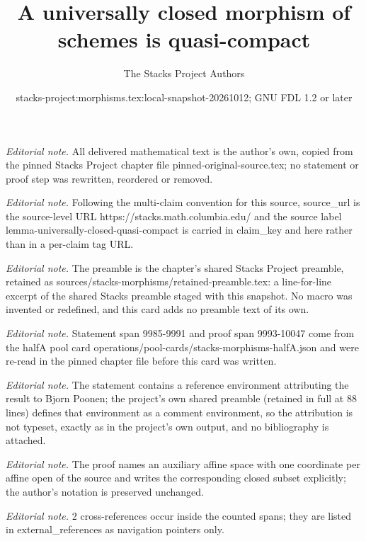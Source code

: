 \documentclass[10pt,a4paper]{amsart}
\title{A universally closed morphism of schemes is quasi-compact}
\author{The Stacks Project Authors}
\date{stacks-project:morphisms.tex:local-snapshot-20261012; GNU FDL 1.2 or later}
\theoremstyle{plain}
\theoremstyle{definition}
\theoremstyle{remark}
\numberwithin{equation}{subsection}
\begin{document}
\maketitle
\noindent\textit{Editorial note.} All delivered mathematical text is the author's own, copied from the pinned Stacks Project chapter file pinned-original-source.tex; no statement or proof step was rewritten, reordered or removed.\par\medskip
\noindent\textit{Editorial note.} Following the multi-claim convention for this source, source\_url is the source-level URL https://stacks.math.columbia.edu/ and the source label lemma-universally-closed-quasi-compact is carried in claim\_key and here rather than in a per-claim tag URL.\par\medskip
\noindent\textit{Editorial note.} The preamble is the chapter's shared Stacks Project preamble, retained as sources/stacks-morphisms/retained-preamble.tex: a line-for-line excerpt of the shared Stacks preamble staged with this snapshot. No macro was invented or redefined, and this card adds no preamble text of its own.\par\medskip
\noindent\textit{Editorial note.} Statement span 9985-9991 and proof span 9993-10047 come from the halfA pool card operations/pool-cards/stacks-morphisms-halfA.json and were re-read in the pinned chapter file before this card was written.\par\medskip
\noindent\textit{Editorial note.} The statement contains a reference environment attributing the result to Bjorn Poonen; the project's own shared preamble (retained in full at 88 lines) defines that environment as a comment environment, so the attribution is not typeset, exactly as in the project's own output, and no bibliography is attached.\par\medskip
\noindent\textit{Editorial note.} The proof names an auxiliary affine space with one coordinate per affine open of the source and writes the corresponding closed subset explicitly; the author's notation is preserved unchanged.\par\medskip
\noindent\textit{Editorial note.} 2 cross-references occur inside the counted spans; they are listed in external\_references as navigation pointers only.\par\medskip
\end{document}

